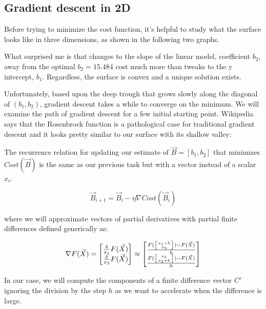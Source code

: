 \begin{fullwidth}
\subsection{Gradient descent in 2D}

Before trying to minimize the cost function, it's helpful to study what the surface looks like in three dimensions, as shown in the following two graphs.

\noindent {}

What surprised me is that changes to the slope of the linear model, coefficient $b_2$, away from the optimal $b_2=15.484$ cost much more than tweaks to the y intercept, $b_1$. Regardless, the surface is convex and a unique solution exists. 

Unfortunately, based upon the deep trough that grows slowly along the diagonal of $(b_1,b_2)$, gradient descent takes a while to converge on the minimum. We will examine the path of gradient descent for a few initial starting point. Wikipedia says that the Rosenbrock function is a pathological case for traditional gradient descent and it looks pretty similar to our surface with its shallow valley:


The recurrence relation for updating our estimate of $\vec{B}=[b_1, b_2]$ that minimizes $Cost(\vec{B})$ is the same as our previous task but with a vector instead of a scalar $x_i$.

\[
\vec{B}_{i+1} = \vec{B}_i - \eta \nabla Cost(\vec{B}_i)
\]

\noindent where we will approximate vectors of partial derivatives with partial finite differences defined generically as:

\[
\nabla F(\vec{X}) =
\begin{bmatrix}
\frac{\delta}{x_1}{F(\vec{X})}\\
\frac{\delta}{x_2}{F(\vec{X})} \\
\end{bmatrix}
\approx
\begin{bmatrix}
\frac{F(\left[ x_1+h \above 0pt{x_2} \right]) - F(\vec{X})}{h} \\
\frac{F(\left[ x_1 \above 0pt{x_2+h} \right]) - F(\vec{X})}{h} \\
\end{bmatrix}
\]

\noindent In our case, we will compute the components of a finite difference vector $C'$ ignoring the division by the step $h$ as we want to accelerate when the difference is large.


\end{fullwidth}
